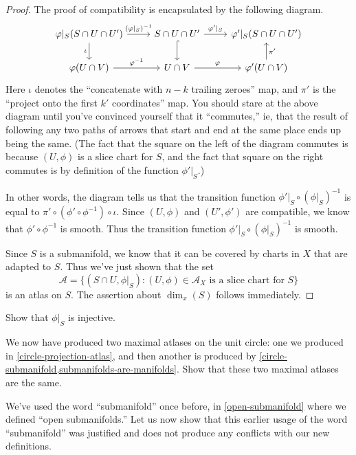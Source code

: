 \begin{proof}
	The proof of compatibility is encapsulated by the following diagram. 
	\[ \begin{tikzcd}
	\phi|_S(S \cap U \cap U') \ar{r}{(\phi|_S)^{-1}} \ar{d}[swap]{\iota} & S \cap U \cap U' \ar[hookrightarrow]{d} \ar{r}{\phi'|_S} & \phi'|_S(S \cap U \cap U') \\
	\phi(U \cap V) \ar{r}{\phi^{-1}} & U \cap V \ar{r}{\phi} & \phi'(U \cap V) \ar{u}[swap]{\pi'}
	\end{tikzcd} \]
	Here $\iota$ denotes the ``concatenate with $n-k$ trailing zeroes'' map, and $\pi'$ is the ``project onto the first $k'$ coordinates'' map. You should stare at the above diagram until you've convinced yourself that it ``commutes,'' ie, that the result of following any two paths of arrows that start and end at the same place ends up being the same. (The fact that the square on the left of the diagram commutes is because $(U, \phi)$ is a slice chart for $S$, and the fact that square on the right commutes is by definition of the function $\phi'|_S$.)
	
	In other words, the diagram tells us that the transition function $\phi'|_S \circ (\phi|_S)^{-1}$ is equal to $\pi' \circ (\phi' \circ \phi^{-1}) \circ \iota$. Since $(U,\phi)$ and $(U', \phi')$ are compatible, we know that $\phi' \circ \phi^{-1}$ is smooth. Thus the transition function $\phi'|_S \circ (\phi|_S)^{-1}$ is smooth. 
	
	Since $S$ is a submanifold, we know that it can be covered by charts in $X$ that are adapted to $S$. Thus we've just shown that the set
	\[ \mathscr{A} = \{ (S \cap U, \phi|_S) : (U, \phi) \in \mathscr{A}_X \text{ is a slice chart for } S \} \]
	is an atlas on $S$. The assertion about $\dim_x(S)$ follows immediately. 
\end{proof}

\begin{exercise} \label{submanifolds-are-manifolds-details}
	Show that $\phi|_S$ is injective. 
\end{exercise}

\begin{exercise}
	We now have produced two maximal atlases on the unit circle: one we produced in \cref{circle-projection-atlas}, and then another is produced by \cref{circle-submanifold,submanifolds-are-manifolds}. Show that these two maximal atlases are the same. 
\end{exercise}

We've used the word ``submanifold'' once before, in \cref{open-submanifold} where we defined ``open submanifolds.'' Let us now show that this earlier usage of the word ``submanifold'' was justified and does not produce any conflicts with our new definitions.  

